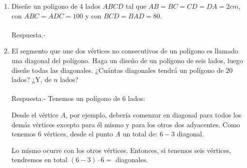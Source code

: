 \begin{enumerate}
	\item Diseñe un polígono de 4 lados $ABCD$ tal que $AB=BC=CD=DA=2cm$, con $ABC=ADC=100$ y con $BCD=BAD=80$.\\\\
	Respuesta.-\; 

	\begin{center}
	\end{center}

	\item El segmento que une dos vértices no consecutivos de un polígono es llamado una diagonal del polígono. Haga un diseño de un polígono de seis lados, luego diseñe todas las diagonales. ¿Cuántas diagonales tendrá un polígono de $20$ lados? ¿Y, de $n$ lados?\\\\
	Respuesta.-\; Tenemos un polígono de 6 lados:
	\begin{center}
	\end{center}
	    Desde el vértice $A$, por ejemplo, debería comenzar en diagonal para todos los demás vértices excepto para él mismo y para los otros dos adyacentes. Como tenemos 6 vértices, desde el punto $A$ un total de: $6-3$ diagonal.

	\begin{center}
	\end{center}
	    Lo mismo ocurre con los otros vértices. Entonces, si tenemos seis vértices, tendremos en total $(6 - 3) · 6 =$ diagonales.


\end{enumerate}
